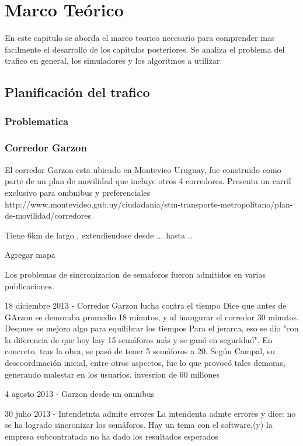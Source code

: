 \chapter{Marco Teórico}

 En este capitulo se aborda el marco teorico necesario para comprender mas facilmente el desarrollo de los capitulos posteriores. Se analiza el problema del trafico en general, los simuladores y los algoritmos a utilizar.

\section{Planificación del trafico}
\subsection{Problematica} 
\subsection{Corredor Garzon}
El corredor Garzon esta ubicado en Montevieo Uruguay, fue construido como parte de un plan de movilidad que incluye otros 4 corredores. 
Presenta un carril exclusivo para ombnibus y preferenciales
http://www.montevideo.gub.uy/ciudadania/stm-transporte-metropolitano/plan-de-movilidad/corredores

Tiene 6km de largo , extendiendose desde ...  hasta ..

Agregar mapa

Los problemas de sincronizacion de semaforos fueron admitidos en varias publicaciones.

18 diciembre 2013 - Corredor Garzon lucha contra el tiempo %
Dice que antes de GArzon se demoraba promedio 18 minutos, y al inaugurar el corredor 30 minutos. Despues se mejoro algo para equilibrar los tiempos
Para el jerarca, eso se dio "con la diferencia de que hoy hay 15 semáforos más y se ganó en seguridad". En concreto, tras la obra, se pasó de tener 5 semáforos a 20. Según Campal, su descoordinación inicial, entre otros aspectos, fue lo que provocó tales demoras, generando malestar en los usuarios.
invesrion de 60 millones


4 agosto 2013 - Garzon desde un omnibus %


30 julio 2013  - Intendetnta admite errores %
La intendenta admte errores y dice: no se ha logrado sincronizar los semáforos. Hay un tema con el software,(y) la empresa subcontratada no ha dado los resultados esperados


